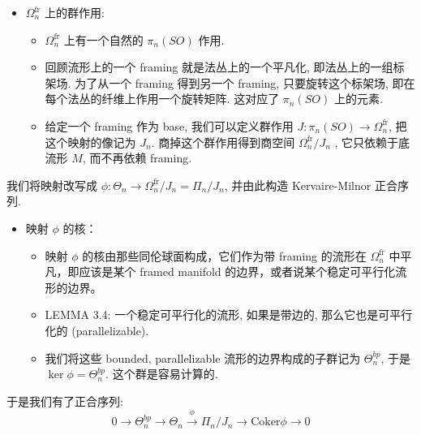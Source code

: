 \documentclass[
]{ctexart}
\providecommand{\tightlist}{%
  \setlength{\itemsep}{0pt}\setlength{\parskip}{0pt}}
\begin{document}
\begin{itemize}
\tightlist
\item
  \(\Omega_n^{\text{fr}}\) 上的群作用:

  \begin{itemize}
  \tightlist
  \item
    \(\Omega_n^{\text{fr}}\) 上有一个自然的 \(\pi_n(SO)\) 作用.
  \item
    回顾流形上的一个 framing 就是法丛上的一个平凡化,
    即法丛上的一组标架场. 为了从一个 framing 得到另一个 framing,
    只要旋转这个标架场, 即在每个法丛的纤维上作用一个旋转矩阵. 这对应了
    \(\pi_n\left(SO\right)\) 上的元素.
  \item
    给定一个 framing 作为 base, 我们可以定义群作用
    \(J:\pi_n\left(SO\right)\to \Omega_n^{\text{fr}}\),
    把这个映射的像记为 \(J_n\). 商掉这个群作用得到商空间
    \(\Omega_n^{\text{fr}}/J_n\) , 它只依赖于底流形 \(M\), 而不再依赖
    framing.
  \end{itemize}
\end{itemize}

我们将映射改写成
\(\phi:\Theta_n\to \Omega_n^{\text{fr}}/J_n=\Pi_n/J_n\), 并由此构造
Kervaire-Milnor 正合序列.

\begin{itemize}
\tightlist
\item
  映射 \(\phi\) 的核：

  \begin{itemize}
  \tightlist
  \item
    映射 \(\phi\) 的核由那些同伦球面构成，它们作为带 framing 的流形在
    \(\Omega_n^{\text{fr}}\) 中平凡，即应该是某个 framed manifold
    的边界，或者说某个稳定可平行化流形的边界。
  \item
    LEMMA 3.4: 一个稳定可平行化的流形, 如果是带边的,
    那么它也是可平行化的 (parallelizable).
  \item
    我们将这些 bounded, parallelizable 流形的边界构成的子群记为
    \(\Theta^{bp}_n\), 于是 \(\ker \phi=\Theta^{bp}_n\).
    这个群是容易计算的.
  \end{itemize}
\end{itemize}

于是我们有了正合序列: \[
        0 \to \Theta^{bp}_n \to \Theta_n \xrightarrow{\phi} \Pi_n/J_n \to \text{Coker} \phi \to 0
        \]
\end{document}
